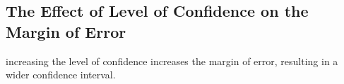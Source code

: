 \documentclass{report}
\begin{document}
    \bigbreak \noindent \bigbreak \noindent 
    \subsection*{The Effect of Level of Confidence on the Margin of Error}
    \bigbreak \noindent 
    increasing the level of confidence increases the margin of error, resulting in a wider confidence interval.

    \bigbreak \noindent \bigbreak \noindent 
\end{document}
